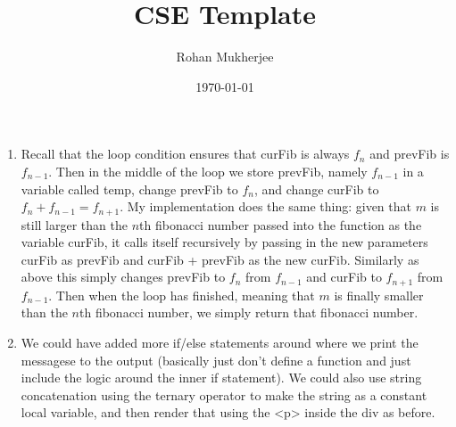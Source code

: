 \documentclass[12pt]{article}
\title{CSE Template}
\date{\today}
\author{Rohan Mukherjee}
\theoremstyle{definitionstyle}
\begin{document}
    \maketitle
    \begin{enumerate}
        \item[4 (c)]
        Recall that the loop condition ensures that curFib is always $f_n$ and prevFib is $f_{n-1}$. Then in the middle of the loop we store prevFib, namely $f_{n-1}$ in a variable called temp, change prevFib to $f_n$, and change curFib to $f_n + f_{n-1} = f_{n+1}$. My implementation does the same thing: given that $m$ is still larger than the $n$th fibonacci number passed into the function as the variable curFib, it calls itself recursively by passing in the new parameters curFib as prevFib and curFib + prevFib as the new curFib. Similarly as above this simply changes prevFib to $f_n$ from $f_{n-1}$ and curFib to $f_{n+1}$ from $f_{n-1}$. Then when the loop has finished, meaning that $m$ is finally smaller than the $n$th fibonacci number, we simply return that fibonacci number. 

        \item[7 (c)]
        We could have added more if/else statements around where we print the messagese to the output (basically just don't define a function and just include the logic around the inner if statement). We could also use string concatenation using the ternary operator to make the string as a constant local variable, and then render that using the <p> inside the div as before.
    \end{enumerate}
\end{document}
